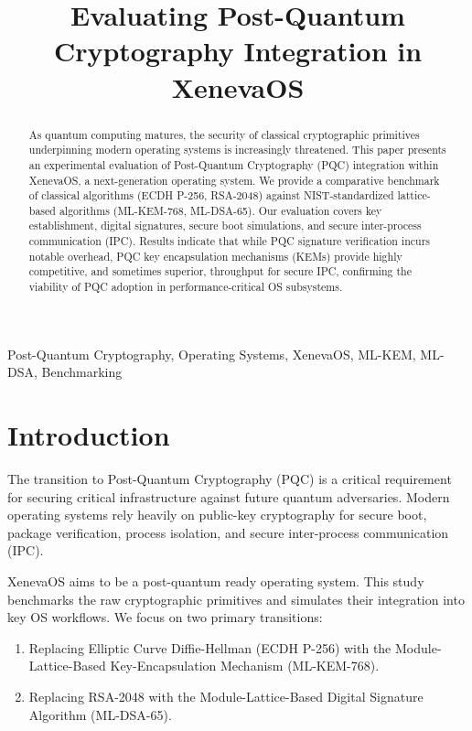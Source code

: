 \documentclass[10pt, conference]{IEEEtran}
\begin{document}
\title{Evaluating Post-Quantum Cryptography Integration in XenevaOS}

\author{
}

\maketitle

\begin{abstract}
As quantum computing matures, the security of classical cryptographic primitives underpinning modern operating systems is increasingly threatened. This paper presents an experimental evaluation of Post-Quantum Cryptography (PQC) integration within XenevaOS, a next-generation operating system. We provide a comparative benchmark of classical algorithms (ECDH P-256, RSA-2048) against NIST-standardized lattice-based algorithms (ML-KEM-768, ML-DSA-65). Our evaluation covers key establishment, digital signatures, secure boot simulations, and secure inter-process communication (IPC). Results indicate that while PQC signature verification incurs notable overhead, PQC key encapsulation mechanisms (KEMs) provide highly competitive, and sometimes superior, throughput for secure IPC, confirming the viability of PQC adoption in performance-critical OS subsystems.
\end{abstract}

\begin{IEEEkeywords}
Post-Quantum Cryptography, Operating Systems, XenevaOS, ML-KEM, ML-DSA, Benchmarking
\end{IEEEkeywords}

\section{Introduction}
The transition to Post-Quantum Cryptography (PQC) is a critical requirement for securing critical infrastructure against future quantum adversaries. Modern operating systems rely heavily on public-key cryptography for secure boot, package verification, process isolation, and secure inter-process communication (IPC). 

XenevaOS aims to be a post-quantum ready operating system. This study benchmarks the raw cryptographic primitives and simulates their integration into key OS workflows. We focus on two primary transitions:
\begin{enumerate}
    \item Replacing Elliptic Curve Diffie-Hellman (ECDH P-256) with the Module-Lattice-Based Key-Encapsulation Mechanism (ML-KEM-768).
    \item Replacing RSA-2048 with the Module-Lattice-Based Digital Signature Algorithm (ML-DSA-65).
\end{enumerate}
\end{document}
